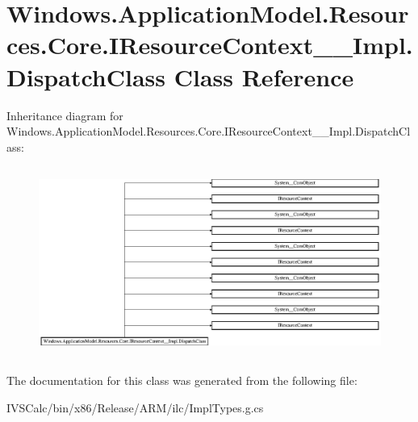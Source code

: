 \hypertarget{class_windows_1_1_application_model_1_1_resources_1_1_core_1_1_i_resource_context_____impl_1_1_dispatch_class}{}\section{Windows.\+Application\+Model.\+Resources.\+Core.\+I\+Resource\+Context\+\_\+\+\_\+\+Impl.\+Dispatch\+Class Class Reference}
\label{class_windows_1_1_application_model_1_1_resources_1_1_core_1_1_i_resource_context_____impl_1_1_dispatch_class}
Inheritance diagram for Windows.\+Application\+Model.\+Resources.\+Core.\+I\+Resource\+Context\+\_\+\+\_\+\+Impl.\+Dispatch\+Class\+:\begin{figure}[H]
\begin{center}
\leavevmode
\includegraphics[height=6.272913cm]{class_windows_1_1_application_model_1_1_resources_1_1_core_1_1_i_resource_context_____impl_1_1_dispatch_class}
\end{center}
\end{figure}


The documentation for this class was generated from the following file\+:\begin{DoxyCompactItemize}
\item 
I\+V\+S\+Calc/bin/x86/\+Release/\+A\+R\+M/ilc/Impl\+Types.\+g.\+cs\end{DoxyCompactItemize}
